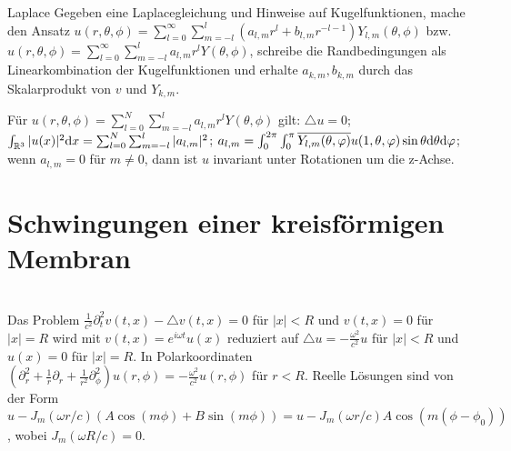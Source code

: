 \begin{namedtheorem}{Laplace}
Gegeben eine Laplacegleichung und Hinweise auf Kugelfunktionen, mache den Ansatz $u(r, \theta, \phi) = \sum_{l=0}^{\infty} \sum_{m=-l}^l (a_{l, m}r^l + b_{l, m}r^{-l - 1})Y_{l, m}(\theta, \phi)$ bzw. $u(r,\theta,\phi)=\sum_{l=0}^{\infty}\sum_{m=-l}^la_{l,m}r^lY(\theta,\phi)$, schreibe die Randbedingungen als Linearkombination der Kugelfunktionen und erhalte $a_{k, m}, b_{k, m}$ durch das Skalarprodukt von $v$ und $Y_{k, m}$.
\end{namedtheorem}

Für $u(r,\theta,\phi)=\sum_{l=0}^N\sum_{m=-l}^la_{l,m}r^lY(\theta,\phi)$ gilt: $\triangle u=0$; $\int_{\mathbb{R}^3}|u(x)|^2\mathrm{d}x=\sum_{l=0}^N\sum_{m=-l}^l|a_{l,m}|^2$; $a_{l,m}=\int_0^{2\pi}\int_0^{\pi}\overline{Y_{l,m}(\theta,\varphi)}u(1,\theta,\varphi)\sin\theta\mathrm{d}\theta\mathrm{d}\varphi$; wenn $a_{l,m}=0$ für $m\neq0$, dann ist $u$ invariant unter Rotationen um die z-Achse.

\section{Schwingungen einer kreisförmigen Membran}
\hspace*{\fill} \\
Das Problem $\frac1{c^2}\partial^2_t v(t,x) - \triangle v(t,x) = 0$ für $|x|<R$ und $v(t,x)=0$ für $|x|=R$ wird mit $v(t,x)=e^{i\omega t}u(x)$ reduziert auf $\triangle u = -\frac{\omega^2}{c^2}u$ für $|x|<R$ und $u(x)=0$ für $|x|=R$. In Polarkoordinaten $(\partial^2_r + \frac1r\partial_r+\frac1{r^2}\partial_{\phi}^2)u(r,\phi)=-\frac{\omega^2}{c^2}u(r,\phi)$ für $r<R$. Reelle Lösungen sind von der Form $u - J_m(\omega r/c)(A\cos(m\phi)+B\sin(m\phi))=u - J_m(\omega r/c)A\cos(m(\phi-\phi_0))$, wobei $J_m(\omega R/c)=0$.







